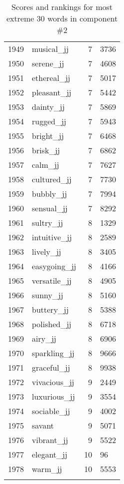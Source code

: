 \begin{longtable}[!htbp]{| rlr@{.}l |}
    1949 & musical\_jj & 7 & 3736 \\
    1950 & serene\_jj & 7 & 4608 \\
    1951 & ethereal\_jj & 7 & 5017 \\
    1952 & pleasant\_jj & 7 & 5442 \\
    1953 & dainty\_jj & 7 & 5869 \\
    1954 & rugged\_jj & 7 & 5943 \\
    1955 & bright\_jj & 7 & 6468 \\
    1956 & brisk\_jj & 7 & 6862 \\
    1957 & calm\_jj & 7 & 7627 \\
    1958 & cultured\_jj & 7 & 7730 \\
    1959 & bubbly\_jj & 7 & 7994 \\
    1960 & sensual\_jj & 7 & 8292 \\
    1961 & sultry\_jj & 8 & 1329 \\
    1962 & intuitive\_jj & 8 & 2589 \\
    1963 & lively\_jj & 8 & 3405 \\
    1964 & easygoing\_jj & 8 & 4166 \\
    1965 & versatile\_jj & 8 & 4905 \\
    1966 & sunny\_jj & 8 & 5160 \\
    1967 & buttery\_jj & 8 & 5388 \\
    1968 & polished\_jj & 8 & 6718 \\
    1969 & airy\_jj & 8 & 6906 \\
    1970 & sparkling\_jj & 8 & 9666 \\
    1971 & graceful\_jj & 8 & 9938 \\
    1972 & vivacious\_jj & 9 & 2449 \\
    1973 & luxurious\_jj & 9 & 3554 \\
    1974 & sociable\_jj & 9 & 4002 \\
    1975 & savant & 9 & 5071 \\
    1976 & vibrant\_jj & 9 & 5522 \\
    1977 & elegant\_jj & 10 & 96 \\
    1978 & warm\_jj & 10 & 5553 \\
    \hline
    \caption{Scores and rankings for most extreme 30 words in component \#2} \\
\end{longtable}
